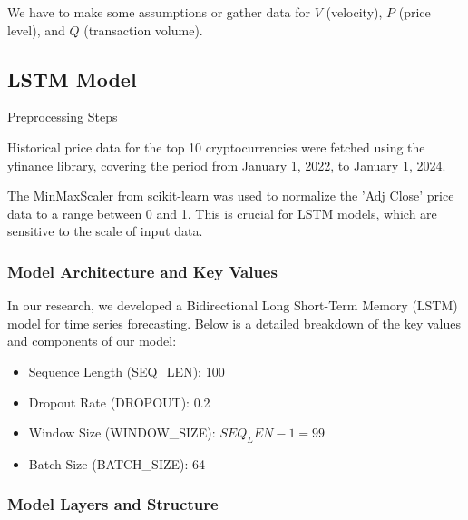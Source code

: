 We have to make some assumptions or gather data for $V$ (velocity), $P$ (price level), and $Q$ (transaction volume).

\subsection{LSTM Model}

Preprocessing Steps

Historical price data for the top 10 cryptocurrencies were fetched using the yfinance library, covering the period from January 1, 2022, to January 1, 2024.

The MinMaxScaler from scikit-learn\cite{scikit-learn} was used to normalize the 'Adj Close' price data to a range between 0 and 1. This is crucial for LSTM models, which are sensitive to the scale of input data.

\subsubsection{Model Architecture and Key Values}

In our research, we developed a Bidirectional Long Short-Term Memory (LSTM) model for time series forecasting. Below is a detailed breakdown of the key values and components of our model:

\begin{itemize}
    \item {Sequence Length (SEQ\_LEN)}: 100
    \item {Dropout Rate (DROPOUT)}: 0.2
    \item {Window Size (WINDOW\_SIZE)}: \(SEQ_LEN - 1 = 99\)
    \item {Batch Size (BATCH\_SIZE)}: 64
\end{itemize}

\subsubsection{Model Layers and Structure}

